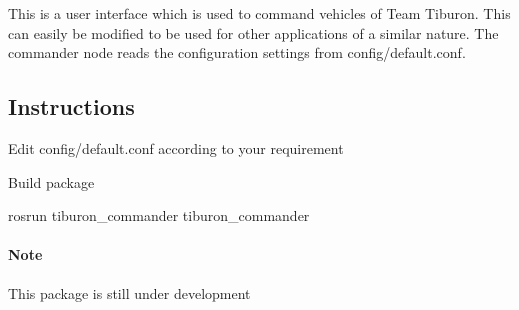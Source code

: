 This is a user interface which is used to command vehicles of Team Tiburon. This can easily be modified to be used for other applications of a similar nature. The commander node reads the configuration settings from {\ttfamily config/default.\+conf}.

\subsection*{Instructions}


\begin{DoxyItemize}
\item Edit {\ttfamily config/default.\+conf} according to your requirement
\item Build package
\item {\ttfamily rosrun tiburon\+\_\+commander tiburon\+\_\+commander}
\end{DoxyItemize}

\paragraph*{Note}

This package is still under development 